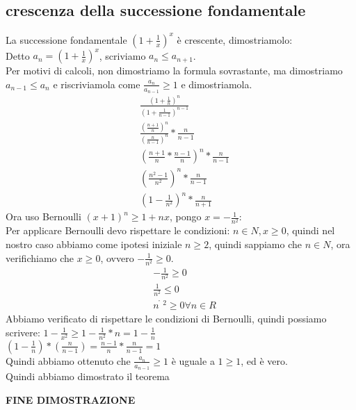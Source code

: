 \documentclass[11pt]{article}
\begin{document}
\subsection{crescenza della successione fondamentale}
La successione fondamentale $(1+\frac{1}{x})^{x}$ è crescente, dimostriamolo:\\
Detto $a_{n} = (1+\frac{1}{x})^{x}$, scriviamo $a_{n} \le a_{n+1}$.\\
Per motivi di calcoli, non dimostriamo la formula sovrastante, ma dimostriamo $a_{n-1} \le a_{n}$ e 
riscriviamola come $\frac{a_{n}}{a_{n-1}} \ge 1$ e dimostriamola.\\
\begin{align*}
    &\frac{(1+\frac{1}{n})^{n}}{(1+\frac{1}{n-1})^{n-1}}\\
    &\frac{(\frac{n+1}{n})^{n}}{(\frac{n}{n-1})^{n}} * \frac{n}{n-1}\\
    &(\frac{n+1}{n}*\frac{n-1}{n})^{n}*\frac{n}{n-1}\\
    &(\frac{n^{2}-1}{n^{2}})^{n}* \frac{n}{n-1}\\
    &(1- \frac{1}{n^{2}})^{n}*\frac{n}{n+1}
\end{align*}
Ora uso Bernoulli $(x+1)^{n} \ge 1 +nx$, pongo $x = -\frac{1}{n^{2}}$:\\
Per applicare Bernoulli devo rispettare le condizioni: $n \in N, x \ge 0$, quindi nel nostro caso abbiamo come 
ipotesi iniziale $n \ge 2$, quindi sappiamo che $n \in N$, ora verifichiamo che $x \ge 0$, ovvero $-\frac{1}{n^{2}} \ge 0$.\\
\begin{align*}
    &-\frac{1}{n^{2}} \ge 0\\
    &\frac{1}{n^{2}} \le 0\\
    &n^{̊2} \ge 0 \forall n \in R
\end{align*}
Abbiamo verificato di rispettare le condizioni di Bernoulli, quindi possiamo scrivere: $1 - \frac{1}{x^{2}} \ge 1 - \frac{1}{n^{2}}*n = 1 - \frac{1}{n}$\\
$(1 - \frac{1}{n})*(\frac{n}{n-1}) = \frac{n-1}{n}*\frac{n}{n-1} = 1$\\
Quindi abbiamo ottenuto che $\frac{a_{n}}{a_{n-1}} \ge 1$ è uguale a $1 \ge 1$, ed è vero.\\
Quindi abbiamo dimostrato il teorema\\
\begin{center}
    \textbf{FINE DIMOSTRAZIONE}
\end{center}
\end{document}
